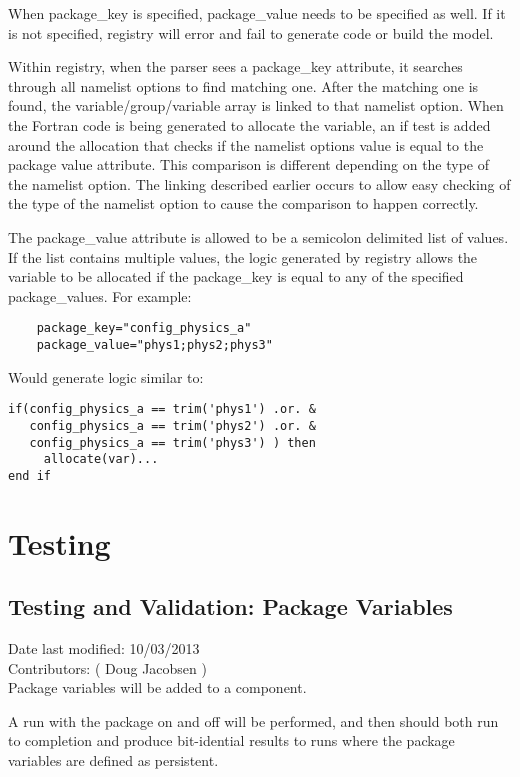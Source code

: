 \documentclass[11pt]{report}
\begin{document}
When package\_key is specified, package\_value needs to be specified as well.
If it is not specified, registry will error and fail to generate code or build
the model.

Within registry, when the parser sees a package\_key attribute, it searches
through all namelist options to find matching one. After the matching one is
found, the variable/group/variable array is linked to that namelist option.
When the Fortran code is being generated to allocate the variable, an if test
is added around the allocation that checks if the namelist options value is
equal to the package value attribute. This comparison is different depending on
the type of the namelist option. The linking described earlier occurs to allow
easy checking of the type of the namelist option to cause the comparison to
happen correctly.

The package\_value attribute is allowed to be a semicolon delimited list of
values. If the list contains multiple values, the logic generated by registry
allows the variable to be allocated if the package\_key is equal to any of the
specified package\_values. For example:
\begin{lstlisting}
	package_key="config_physics_a"
	package_value="phys1;phys2;phys3"
\end{lstlisting}

Would generate logic similar to:
\begin{lstlisting}
if(config_physics_a == trim('phys1') .or. &
   config_physics_a == trim('phys2') .or. &
   config_physics_a == trim('phys3') ) then
     allocate(var)...
end if
\end{lstlisting}


\chapter{Testing}

\section{Testing and Validation: Package Variables}
Date last modified: 10/03/2013 \\
Contributors: ( Doug Jacobsen ) \\

Package variables will be added to a component.

A run with the package on and off will be performed, and then should both run
to completion and produce bit-idential results to runs where the package
variables are defined as persistent.

\end{document}
